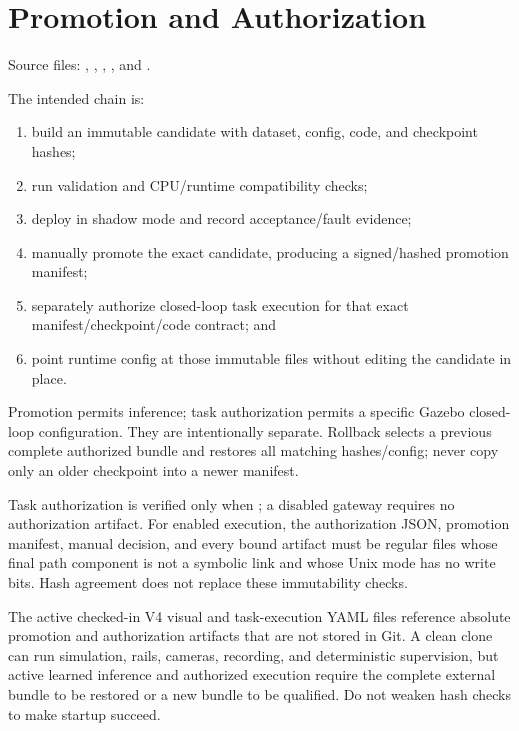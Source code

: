 \section{Promotion and Authorization}

Source files: ,
,
,
, and
.

The intended chain is:

\begin{enumerate}
  \item build an immutable candidate with dataset, config, code, and checkpoint
        hashes;
  \item run validation and CPU/runtime compatibility checks;
  \item deploy in shadow mode and record acceptance/fault evidence;
  \item manually promote the exact candidate, producing a signed/hashed
        promotion manifest;
  \item separately authorize closed-loop task execution for that exact
        manifest/checkpoint/code contract; and
  \item point runtime config at those immutable files without editing the
        candidate in place.
\end{enumerate}

Promotion permits inference; task authorization permits a specific Gazebo
closed-loop configuration. They are intentionally separate. Rollback selects a
previous complete authorized bundle and restores all matching hashes/config;
never copy only an older checkpoint into a newer manifest.

Task authorization is verified only when ; a
disabled gateway requires no authorization artifact. For enabled execution,
the authorization JSON, promotion manifest, manual decision, and every bound
artifact must be regular files whose final path component is not a symbolic
link and whose Unix mode has no write bits. Hash agreement does not replace
these immutability checks.

\begin{warningbox}
The active checked-in V4 visual and task-execution YAML files reference
absolute  promotion and authorization artifacts that are
not stored in Git. A clean clone can run simulation, rails, cameras, recording,
and deterministic supervision, but active learned inference and authorized
execution require the complete external bundle to be restored or a new bundle
to be qualified. Do not weaken hash checks to make startup succeed.
\end{warningbox}


